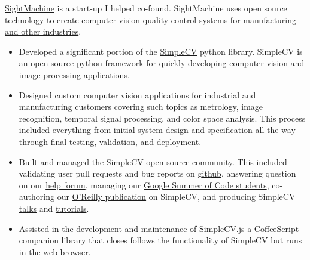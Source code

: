 \documentclass[10pt]{article}
\newenvironment{outerlist}[1][\enskip\textbullet]%
        {\begin{itemize}[#1]}{\end{itemize}%
         \vspace{-.6\baselineskip}}
\newcommand{\blankline}{\quad\pagebreak[2]}
\begin{document}
\blankline
\href{http://www.sightmachine.com/}{SightMachine} is a start-up I helped co-found. SightMachine uses open source technology to create \href{http://www.theatlantic.com/technology/archive/2012/09/the-internet-and-things-how-manufacturing-could-get-better-with-a-dose-of-networked-data/262621/}{computer vision quality control systems} for \href{http://radar.oreilly.com/2013/02/sight-machine-new-vision-in-old-industry.html}{manufacturing and other industries}. 
\\
\begin{outerlist}
\item Developed a significant portion of the \href{http://www.simplecv.org/}{SimpleCV} python library. SimpleCV is an open source python framework for quickly developing computer vision and image processing applications. 
\item Designed custom computer vision applications for industrial and manufacturing customers covering such topics as metrology, image recognition, temporal signal processing, and color space analysis. This process included everything from initial system design and specification all the way through final testing, validation, and deployment.
\item Built and managed the SimpleCV open source community. This included validating user pull requests and bug reports on \href{https://github.com/sightmachine/SimpleCV}{github}, answering question on our \href{http://help.simplecv.org/questions/}{help forum}, managing our \href{http://sourceforge.net/blog/simplecv-gsoc/}{Google Summer of Code students}, co-authoring our \href{http://shop.oreilly.com/product/0636920024057.do}{O'Reilly publication} on SimpleCV, and producing SimpleCV \href{http://www.youtube.com/watch?v=UZSm7Q2bZoc&}{talks} and \href{http://www.youtube.com/watch?v=UZSm7Q2bZoc&}{tutorials}.
\item Assisted in the development and maintenance of \href{http://demo.simplecv.org/}{SimpleCV.js} a CoffeeScript companion library that closes follows the functionality of SimpleCV but runs in the web browser. 
\end{outerlist}
\blankline
\end{document}
